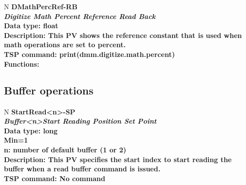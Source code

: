\documentclass[openany]{article}
\begin{document}
		\begin{tabular}{N}
			\hline
			\bfseries DMathPercRef-RB\label{pv:dmathpercref-rb} \\ \hline
			\emph{Digitize Math Percent Reference Read Back} \\
			Data type: float \\
			Description: This PV shows the reference constant that is used when math operations are set to percent. \\
			TSP command: print(dmm.digitize.math.percent) \\
			Functions: \\
			\arrayrulecolor{\FuncTableBorderColor}

		\end{tabular}

	\subsection{Buffer operations}\label{pvgroup:buffer-operations}

		\paragraph{} %

		\begin{tabular}{N}
			\hline
			\bfseries StartRead\textless n\textgreater-SP\label{pv:startread-sp} \\ \hline
			\emph{Buffer\textless n\textgreater Start Reading Position Set Point} \\
			Data type: long \\
			Min=1 \\
			n: number of default buffer (1 or 2) \\
			Description: This PV specifies the start index to start reading the buffer when a read buffer command is issued. \\
			TSP command: No command
		\end{tabular}
\end{document}
